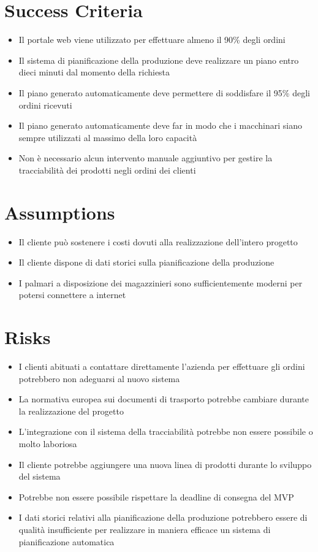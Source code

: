 \section{Success Criteria} %
\begin{itemize}
  \item Il portale web viene utilizzato per effettuare almeno il 90\% degli ordini
  \item Il sistema di pianificazione della produzione deve realizzare un piano entro dieci minuti dal momento della richiesta
  \item Il piano generato automaticamente deve permettere di soddisfare il 95\% degli ordini ricevuti
  \item Il piano generato automaticamente deve far in modo che i macchinari siano sempre utilizzati al massimo della loro capacità
  \item Non è necessario alcun intervento manuale aggiuntivo per gestire la tracciabilità dei prodotti negli ordini dei clienti
\end{itemize}

\section{Assumptions}
\begin{itemize}
  \item Il cliente può sostenere i costi dovuti alla realizzazione dell'intero progetto
  \item Il cliente dispone di dati storici sulla pianificazione della produzione
  \item I palmari a disposizione dei magazzinieri sono sufficientemente moderni per potersi connettere a internet
\end{itemize}

\section{Risks}
\begin{itemize}
  \item I clienti abituati a contattare direttamente l'azienda per effettuare gli ordini potrebbero non adeguarsi al nuovo sistema
  \item La normativa europea sui documenti di trasporto potrebbe cambiare durante la realizzazione del progetto
  \item L'integrazione con il sistema della tracciabilità potrebbe non essere possibile o molto laboriosa
  \item Il cliente potrebbe aggiungere una nuova linea di prodotti durante lo sviluppo del sistema
  \item Potrebbe non essere possibile rispettare la deadline di consegna del MVP
  \item I dati storici relativi alla pianificazione della produzione potrebbero essere di qualità insufficiente per realizzare in maniera efficace un sistema di pianificazione automatica
\end{itemize}

